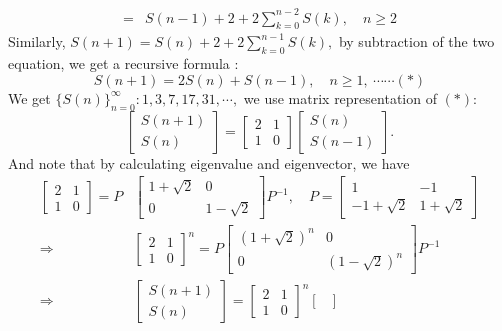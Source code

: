 \documentclass[12pt,a4paper]{article}
\begin{document}
\begin{enumerate}
\begin{enumerate}
\begin{align*}
	    	=&S(n-1)+2+2\sum_{k=0}^{n-2}S(k),\quad n\geq 2
	    \end{align*}
	    Similarly, $S(n+1)=S(n)+2+2\sum\limits_{k=0}^{n-1}S(k),$ by subtraction of the two equation, we get a recursive formula :
	    \[
	    S(n+1)=2S(n)+S(n-1),\quad n\geq 1,\ \cdots\cdots(*)
	    \]
	    We get $\{S(n)\}_{n=0}^\infty:1,3,7,17,31,\cdots,$ we use matrix representation of $(*):$
	    \[
	    \begin{bmatrix}
	    S(n+1)\\
	    S(n)
	    \end{bmatrix}=\begin{bmatrix}
	    2 & 1\\
	    1 & 0
	    \end{bmatrix}\begin{bmatrix}
	    S(n)\\
	    S(n-1)
	    \end{bmatrix}.
	    \]
	    And note that by calculating eigenvalue and eigenvector, we have 
	    \begin{align*}
	    \begin{bmatrix}
	    2 & 1\\
	    1 & 0
	    \end{bmatrix}=P&\begin{bmatrix}
	    1+\sqrt{2} & 0\\
	    0 & 1-\sqrt{2}
	    \end{bmatrix}P^{-1},\quad P=\begin{bmatrix}
	    1 & -1\\
	    -1+\sqrt{2} & 1+\sqrt{2}
	    \end{bmatrix}\\
	    \Rightarrow & \begin{bmatrix}
	    2 & 1\\
	    1 & 0
	    \end{bmatrix}^n=P\begin{bmatrix}
	    (1+\sqrt{2})^n & 0\\
	    0 & (1-\sqrt{2})^n
	    \end{bmatrix}P^{-1}\\
	    \Rightarrow &\begin{bmatrix}
	    S(n+1)\\
	    S(n)
	    \end{bmatrix}=\begin{bmatrix}
	    2 & 1\\
	    1 & 0
	    \end{bmatrix}^n\begin{bmatrix}

\end{bmatrix}
\end{align*}
\end{enumerate}
\end{enumerate}
\end{document}
